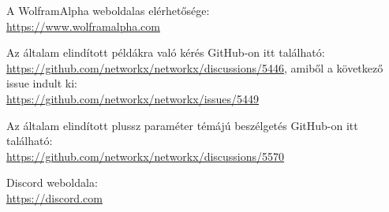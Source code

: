 \documentclass[
]{thesis-ekf}
\theoremstyle{definition}
\theoremstyle{remark}
\begin{document}
\begin{thebibliography}{2}
	A WolframAlpha weboldalas elérhetősége:
	\\\url{https://www.wolframalpha.com}
	
	Az általam elindított példákra való kérés GitHub-on itt található:
	\\\url{https://github.com/networkx/networkx/discussions/5446}, amiből a következő issue indult ki:
	\\\url{https://github.com/networkx/networkx/issues/5449}	
	
	Az általam elindított plussz paraméter témájú beszélgetés GitHub-on itt található:
	\\\url{https://github.com/networkx/networkx/discussions/5570}

	Discord weboldala:
	\\\url{https://discord.com}
\end{thebibliography}
	
	
\end{document}
